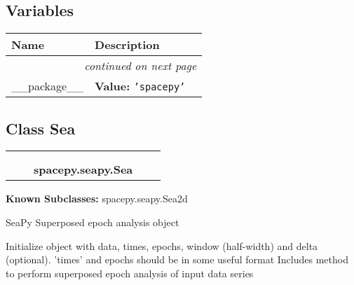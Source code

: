 
  \subsection{Variables}

    \vspace{-1cm}
\hspace{\varindent}\begin{longtable}{|p{\varnamewidth}|p{\vardescrwidth}|l}
\cline{1-2}
\cline{1-2} \centering \textbf{Name} & \centering \textbf{Description}& \\
\cline{1-2}
\endhead\cline{1-2}\multicolumn{3}{r}{\small\textit{continued on next page}}\\\endfoot\cline{1-2}
\endlastfoot\raggedright \_\-\_\-p\-a\-c\-k\-a\-g\-e\-\_\-\_\- & \raggedright \textbf{Value:} 
{\tt \texttt{'}\texttt{spacepy}\texttt{'}}&\\
\cline{1-2}
\end{longtable}



\subsection{Class Sea}

    \label{spacepy:seapy:Sea}
\begin{tabular}{cccccc}
\multicolumn{2}{r}{\settowidth{\BCL}{object}\multirow{2}{\BCL}{object}}
&&
  \\\cline{3-3}
  &&\multicolumn{1}{c|}{}
&&
  \\
&&\multicolumn{2}{l}{\textbf{spacepy.seapy.Sea}}
\end{tabular}

\textbf{Known Subclasses:} spacepy.seapy.Sea2d

SeaPy Superposed epoch analysis object

Initialize object with data, times, epochs, window (half-width) and delta 
(optional). 'times' and epochs should be in some useful format Includes 
method to perform superposed epoch analysis of input data series

